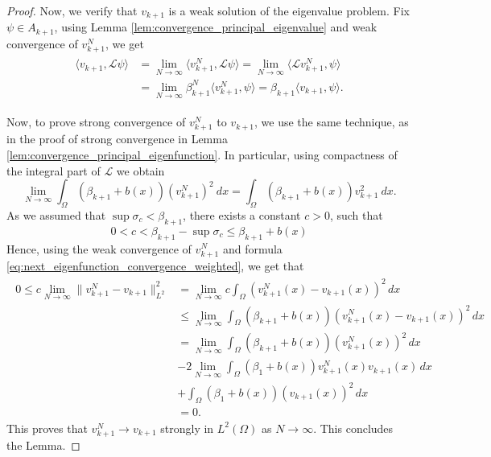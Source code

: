 \documentclass[12pt, a4paper]{article}
\theoremstyle{break}
\theoremstyle{break}
\theoremstyle{break}
\theoremstyle{break}
\theoremstyle{break}
\theoremstyle{break}
\theoremstyle{break}
\theoremstyle{break}
\theoremstyle{break}
\begin{document}
\begin{proof}
    Now, we verify that $v_{k+1}$ is a weak solution of the eigenvalue problem. Fix $\psi \in A_{k+1}$, using Lemma \ref{lem:convergence_principal_eigenvalue} and weak convergence of $v_{k+1}^N$, we get
    \begin{align}
        \begin{split}
            \langle v_{k+1}, \mathcal{L} \psi \rangle
            &= \lim_{N \to \infty} \langle v_{k+1}^N, \mathcal{L} \psi \rangle = \lim_{N \to \infty} \langle \mathcal{L} v_{k+1}^N, \psi \rangle \\
            &= \lim_{N \to \infty} \beta_{k+1}^N \langle v_{k+1}^N, \psi \rangle = \beta_{k+1} \langle v_{k+1}, \psi \rangle.
        \end{split}
    \end{align}
    
    Now, to prove strong convergence of $v_{k+1}^N$ to $v_{k+1}$, we use the same technique, as in the proof of strong convergence in Lemma \ref{lem:convergence_principal_eigenfunction}. In particular, using compactness of the integral part of $\mathcal{L}$ we obtain
    \begin{equation}
        \label{eq:next_eigenfunction_convergence_weighted}
        \lim_{N \rightarrow \infty} \int_\Omega (\beta_{k+1} + b(x)) (v_{k+1}^N)^2\:dx = \int_\Omega (\beta_{k+1} + b(x))v_{k+1}^2\:dx.
    \end{equation}
    As we assumed that $\sup \sigma_c < \beta_{k+1}$, there exists a constant $c > 0$, such that 
    \begin{equation}
        0 < c < \beta_{k+1} - \sup \sigma_c \leq \beta_{k+1} + b(x)
    \end{equation}
    Hence, using the weak convergence of $v_{k+1}^N$ and formula \eqref{eq:next_eigenfunction_convergence_weighted}, we get that
    \begin{align}
        \begin{split}
            0 \leq c \lim_{N\rightarrow \infty}\|v_{k+1}^N - v_{k+1}\|_{L^2}^2 
            &= \lim_{N\rightarrow \infty} c \int_\Omega (v_{k+1}^N(x) - v_{k+1}(x))^2 \, dx \nonumber \\
            &\leq \lim_{N\rightarrow \infty} \int_\Omega (\beta_{k+1} + b(x))(v_{k+1}^N(x) - v_{k+1}(x))^2 \, dx \nonumber \\
            &= \lim_{N\rightarrow \infty} \int_\Omega (\beta_{k+1} + b(x))(v_{k+1}^N(x))^2 \, dx \nonumber \\
            &- 2 \lim_{N\rightarrow \infty} \int_\Omega (\beta_1 + b(x))v_{k+1}^N(x)v_{k+1}(x) \, dx \nonumber \\
            &+ \int_\Omega (\beta_1 + b(x))(v_{k+1}(x))^2 \, dx \\
            &= 0.
        \end{split}
    \end{align}
    This proves that $v_{k+1}^N \rightarrow v_{k+1}$ strongly in $L^2(\Omega)$ as $N \rightarrow \infty$. This concludes the Lemma.
\end{proof}



\end{document}
